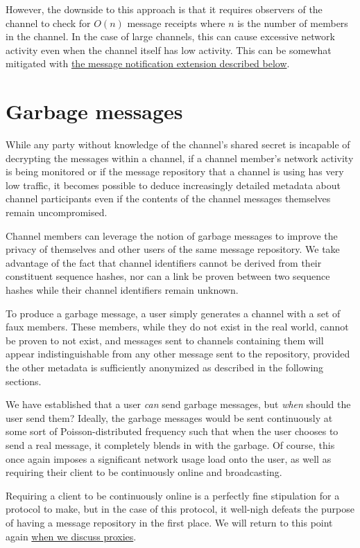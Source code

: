 However, the downside to this approach is that it requires observers of the channel to check for $O(n)$ message receipts where $n$ is the number of members in the channel. In the case of large channels, this can cause excessive network activity even when the channel itself has low activity. This can be somewhat mitigated with \hyperref[message-notifications]{the message notification extension described below}.

\section{Garbage messages}\label{garbage-messages}

While any party without knowledge of the channel's shared secret is incapable of decrypting the messages within a channel, if a channel member's network activity is being monitored or if the message repository that a channel is using has very low traffic, it becomes possible to deduce increasingly detailed metadata about channel participants even if the contents of the channel messages themselves remain uncompromised.

Channel members can leverage the notion of garbage messages to improve the privacy of themselves and other users of the same message repository. We take advantage of the fact that channel identifiers cannot be derived from their constituent sequence hashes, nor can a link be proven between two sequence hashes while their channel identifiers remain unknown.

To produce a garbage message, a user simply generates a channel with a set of faux members. These members, while they do not exist in the real world, cannot be proven to not exist, and messages sent to channels containing them will appear indistinguishable from any other message sent to the repository, provided the other metadata is sufficiently anonymized as described in the following sections.

We have established that a user \emph{can} send garbage messages, but \emph{when} should the user send them? Ideally, the garbage messages would be sent continuously at some sort of Poisson-distributed frequency such that when the user chooses to send a real message, it completely blends in with the garbage. Of course, this once again imposes a significant network usage load onto the user, as well as requiring their client to be continuously online and broadcasting.

Requiring a client to be continuously online is a perfectly fine stipulation for a protocol to make, but in the case of this protocol, it well-nigh defeats the purpose of having a message repository in the first place. We will return to this point again \hyperref[proxies]{when we discuss proxies}.

